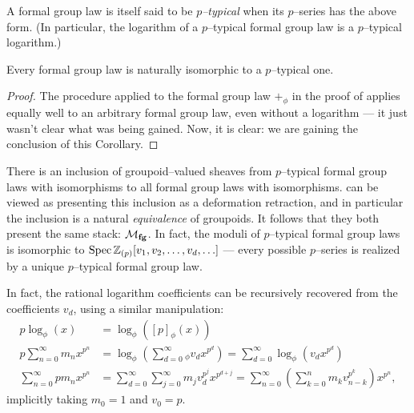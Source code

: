 \begin{definition}
A formal group law is itself said to be \textit{$p$--typical} when its $p$--series has the above form.  (In particular, the logarithm of a $p$--typical formal group law is a $p$--typical logarithm.)
\end{definition}

\begin{corollary}\label{EveryFGLIsPTypical}
Every formal group law is naturally isomorphic to a $p$--typical one.
\end{corollary}
\begin{proof}
The procedure applied to the formal group law $+_\phi$ in the proof of  applies equally well to an arbitrary formal group law, even without a logarithm --- it just wasn't clear what was being gained.  Now, it is clear: we are gaining the conclusion of this Corollary.
\end{proof}

\begin{remark}\label{EveryPSeriesArises}
There is an inclusion of groupoid--valued sheaves from $p$--typical formal group laws with isomorphisms to all formal group laws with isomorphisms.   can be viewed as presenting this inclusion as a deformation retraction, and in particular the inclusion is a natural \emph{equivalence} of groupoids.  It follows that they both present the same stack: $\mathcal{M}_{\mathbf{fg}}$.  In fact, the moduli of $p$--typical formal group laws is isomorphic to $\operatorname{Spec} \mathbb Z_{(p)}[v_1, v_2, \ldots, v_d, \ldots]$ --- every possible $p$--series is realized by a unique $p$--typical formal group law.
\end{remark}

\begin{remark}\label{RecoverLogarithmRemark}
In fact, the rational logarithm coefficients can be recursively recovered from the coefficients $v_d$, using a similar manipulation:
\begin{align*}
p \log_\phi(x) & = \log_\phi\left([p]_\phi(x)\right) \\
p \sum_{n=0}^\infty m_n x^{p^n} & = \log_\phi \left(\sum_{d=0}^\infty{}_\phi v_d x^{p^d} \right) = \sum_{d=0}^\infty \log_\phi\left(v_d x^{p^d}\right) \\
\sum_{n=0}^\infty p m_n x^{p^n} & = \sum_{d=0}^\infty \sum_{j=0}^\infty m_j v_d^{p^j} x^{p^{d+j}} = \sum_{n=0}^\infty \left( \sum_{k=0}^n m_k v_{n-k}^{p^k} \right) x^{p^n},
\end{align*}
implicitly taking $m_0 = 1$ and $v_0 = p$.
\end{remark}

